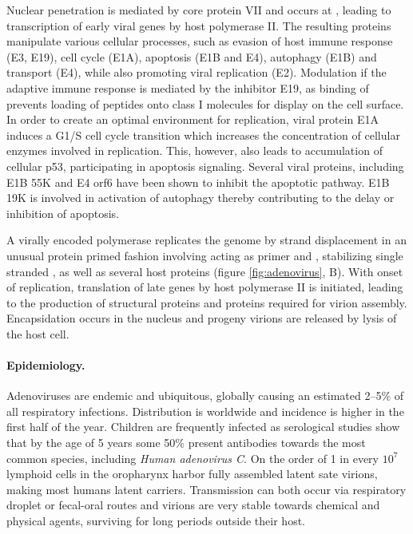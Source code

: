 Nuclear penetration is mediated by core protein VII and occurs at , leading to transcription of early viral genes by host  polymerase II. The resulting proteins manipulate various cellular processes, such as evasion of host immune response (E3, E19), cell cycle (E1A), apoptosis (E1B and E4), autophagy (E1B) and  transport (E4), while also promoting viral  replication (E2). Modulation if the adaptive immune response is mediated by the  inhibitor E19, as binding of  prevents loading of peptides onto  class I molecules for display on the cell surface. In order to create an optimal environment for replication, viral protein E1A induces a G1\slash S cell cycle transition which increases the concentration of cellular enzymes involved in  replication. This, however, also leads to accumulation of cellular p53, participating in apoptosis signaling. Several viral proteins, including E1B 55K and E4 orf6 have been shown to inhibit the apoptotic pathway. E1B 19K is involved in activation of autophagy thereby contributing to the delay or inhibition of apoptosis.

A virally encoded  polymerase replicates the genome by  strand displacement in an unusual protein primed fashion involving  acting as primer and , stabilizing single stranded , as well as several host proteins (figure \ref{fig:adenovirus}, B). With onset of replication, translation of late genes by host  polymerase II is initiated, leading to the production of structural proteins and proteins required for virion assembly. Encapsidation occurs in the nucleus and progeny virions are released by lysis of the host cell.

\paragraph{Epidemiology.}
Adenoviruses are endemic and ubiquitous, globally causing an estimated 2--5\% of all respiratory infections. Distribution is worldwide and incidence is higher in the first half of the year. Children are frequently infected as serological studies show that by the age of 5 years some 50\% present antibodies towards the most common species, including \textit{Human adenovirus C}. On the order of 1 in every $10^7$ lymphoid cells in the oropharynx harbor fully assembled latent sate virions, making most humans latent carriers. Transmission can both occur via respiratory droplet or fecal-oral routes and virions are very stable towards chemical and physical agents, surviving for long periods outside their host.

